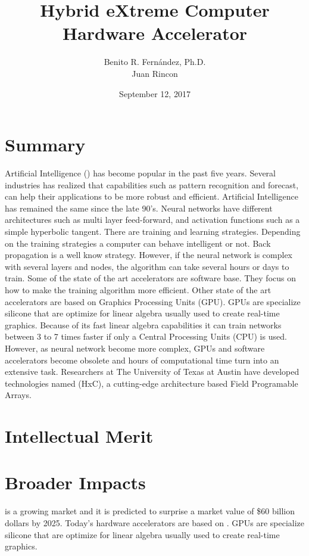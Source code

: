 \documentclass[12pt]{article}
\author{
    Benito R. Fern\'andez, Ph.D.\\
    Juan Rincon
    }
\title{\huge{Hybrid eXtreme Computer \cool{HxC}}\\
Hardware Accelerator}
\date{September 12, 2017}
\begin{document}
	\maketitle
    \section*{Summary}
    
        Artificial Intelligence () has become popular in the past five years. Several industries has realized that capabilities such as pattern recognition and forecast, can help their applications to be more robust and efficient.  Artificial Intelligence has remained the same since the late 90's. Neural networks have different architectures such as multi layer feed-forward, and activation functions such as a simple hyperbolic tangent. There are training and learning strategies. Depending on the training strategies a computer can behave intelligent or not. Back propagation is a well know strategy. However, if the neural network is complex with several layers and nodes, the algorithm can take several hours or days to train. Some of the state of the art accelerators are software base. They focus on how to make the training algorithm more efficient. Other state of the art accelerators are based on Graphics Processing Units (GPU). GPUs are specialize silicone that are optimize for linear algebra usually used to create real-time graphics. Because of its fast linear algebra capabilities it can train networks between 3 to 7 times faster if only a Central Processing Units (CPU) is used. However, as neural network become more complex, GPUs and software accelerators become obsolete and hours of computational time turn into an extensive task. Researchers at The University of Texas at Austin have developed technologies named \cool(HxC), a cutting-edge architecture based Field Programable Arrays. 
        \par
        
        
    \section*{Intellectual Merit}
    \section*{Broader Impacts}
     is a growing market and it is predicted to surprise a market value of \$60 billion dollars by 2025. %
    Today's hardware accelerators are based on . GPUs are specialize silicone that are optimize for linear algebra usually used to create real-time graphics. 
    
    
    
            
\end{document}
